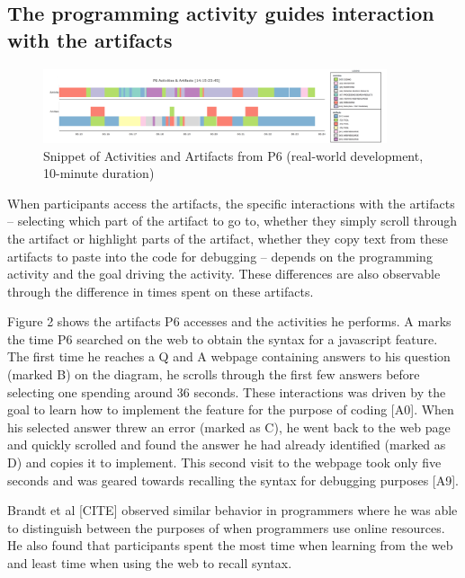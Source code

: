\subsection{The programming activity guides interaction with the artifacts}

\begin{figure}
\includegraphics[width=0.9\textwidth]{figures/P6timeplot}
\caption{Snippet of Activities and Artifacts from P6 (real-world development, 10-minute duration)}
\end{figure}

When participants access the artifacts, the specific interactions with the artifacts -- selecting which part of the artifact to go to, whether they simply scroll through the artifact or highlight parts of the artifact, whether they copy text from these artifacts to paste into the code for debugging -- depends on the programming activity and the goal driving the activity. These differences are also observable through the difference in times spent on these artifacts.

Figure 2 shows the artifacts P6 accesses and the activities he performs. A marks the time P6 searched on the web to obtain the syntax for a javascript feature. The first time he reaches a Q and A webpage containing answers to his question (marked B) on the diagram, he scrolls through the first few answers before selecting one spending around 36 seconds. These interactions was driven by the goal to learn how to implement the feature for the purpose of coding [A0]. When his selected answer threw an error (marked as C), he went back to the web page and quickly scrolled and found the answer he had already identified (marked as D) and copies it to implement. This second visit to the webpage took only five seconds and was geared towards recalling the syntax for debugging purposes [A9]. 

Brandt et al [CITE] observed similar behavior in programmers where he was able to distinguish between the purposes of when programmers use online resources. He also found that participants spent the most time when learning from the web and least time when using the web to recall syntax.

